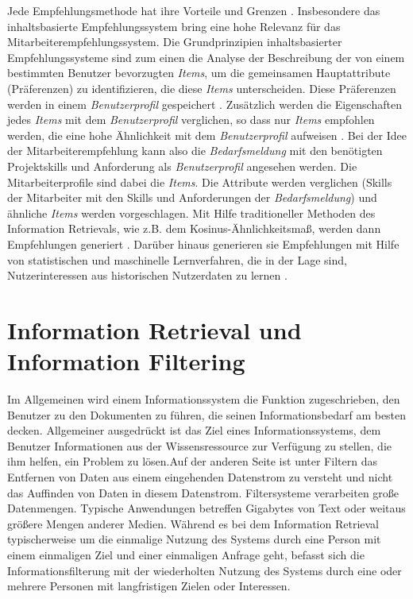 Jede Empfehlungsmethode hat ihre Vorteile und Grenzen \cite{lu2020recommender}. Insbesondere das inhaltsbasierte Empfehlungssystem bring eine hohe Relevanz für das Mitarbeiterempfehlungssystem. Die Grundprinzipien inhaltsbasierter Empfehlungssysteme sind zum einen die Analyse der Beschreibung der von einem bestimmten Benutzer bevorzugten \emph{Items}, um die gemeinsamen Hauptattribute (Präferenzen) zu identifizieren, die diese \emph{Items} unterscheiden. Diese Präferenzen werden in einem \emph{Benutzerprofil} gespeichert \cite{lu2020recommender}. Zusätzlich werden die Eigenschaften jedes \emph{Items} mit dem \emph{Benutzerprofil} verglichen, so dass nur \emph{Items} empfohlen werden, die eine hohe Ähnlichkeit mit dem \emph{Benutzerprofil} aufweisen \cite{lu2020recommender}. Bei der Idee der Mitarbeiterempfehlung kann also die \emph{Bedarfsmeldung} mit den benötigten Projektskills und Anforderung als \emph{Benutzerprofil} angesehen werden. Die Mitarbeiterprofile sind dabei die \emph{Items}. Die Attribute werden verglichen (Skills der Mitarbeiter mit den Skills und Anforderungen der \emph{Bedarfsmeldung}) und ähnliche \emph{Items} werden vorgeschlagen. Mit Hilfe traditioneller Methoden des Information Retrievals, wie z.B. dem Kosinus-Ähnlichkeitsmaß, werden dann Empfehlungen generiert \cite{lu2020recommender}. Darüber hinaus generieren sie Empfehlungen mit Hilfe von statistischen und maschinelle Lernverfahren, die in der Lage sind, Nutzerinteressen aus historischen Nutzerdaten zu lernen \cite{lu2020recommender}.
\section{Information Retrieval und Information Filtering}
Im Allgemeinen wird einem Informationssystem die Funktion zugeschrieben, den Benutzer zu den Dokumenten zu führen, die seinen Informationsbedarf am besten decken. Allgemeiner ausgedrückt ist das Ziel eines Informationssystems, dem Benutzer Informationen aus der Wissensressource zur Verfügung zu stellen, die ihm helfen, ein Problem zu lösen.Auf der anderen Seite ist unter Filtern das Entfernen von Daten aus einem eingehenden Datenstrom zu versteht und nicht das Auffinden von Daten in diesem Datenstrom. Filtersysteme verarbeiten große Datenmengen. Typische Anwendungen betreffen Gigabytes von Text oder weitaus größere Mengen anderer Medien. Während es bei dem Information Retrieval typischerweise um die einmalige Nutzung des Systems durch eine Person mit einem einmaligen Ziel und einer einmaligen Anfrage geht, befasst sich die Informationsfilterung mit der wiederholten Nutzung des Systems durch eine oder mehrere Personen mit langfristigen Zielen oder Interessen.\cite{belkin1992information}
